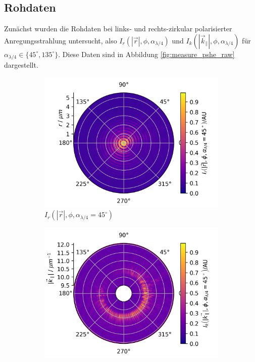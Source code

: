 \documentclass[a4paper, titlepage,  ngerman]{book}
\begin{document}
	\subsection{Rohdaten}
	Zunächst wurden die Rohdaten bei links- und rechts-zirkular polarisierter Anregungsstrahlung untersucht, also $I_r(|\vec{r}|, \phi, \alpha_{\lambda /4})$ und $I_k(|\vec{k}_\parallel|, \phi, \alpha_{\lambda /4})$ für $\alpha_{\lambda /4} \in \{45^\circ, 135^\circ\}$. Diese Daten sind in Abbildung \ref{fig:measure_pshe_raw} dargestellt. 
	\begin{figure}
		\begin{subfigure}{0.49\textwidth}
			\centering
			\includegraphics[width=\textwidth]{figures/new/4_3_fp_45.png}
			\caption{$I_r(|\vec{r}|, \phi, \alpha_{\lambda /4} = 45^\circ)$}
			\label{fig:raw_fp_45}
		\end{subfigure}
		\begin{subfigure}{0.5\textwidth}
			\centering
			\includegraphics[width=\textwidth]{figures/new/4_3_bfp_45.png}

\end{subfigure}
\end{figure}
\end{document}
